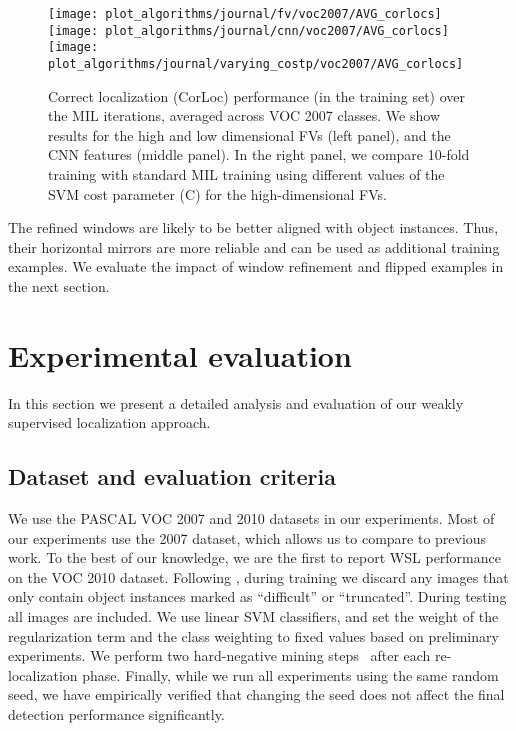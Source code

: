 \documentclass[10pt,journal,cspaper,final,twocolumn,compsoc]{./IEEEtran}
\def\VOC{PASCAL VOC }
\begin{document}
{\begin{table*}
\begin{center}
\begin{tabular}{|l|cccccccccccccccccccc|c|}
\hline
\end{tabular}
\end{center}
\end{table*}
}\begin{figure*}
\begin{center}
\texttt{[image: plot\_algorithms/journal/fv/voc2007/AVG\_corlocs]} 
\texttt{[image: plot\_algorithms/journal/cnn/voc2007/AVG\_corlocs]} 
\texttt{[image: plot\_algorithms/journal/varying\_costp/voc2007/AVG\_corlocs]} 
\end{center}
\caption{Correct localization (CorLoc) performance (in the training set) over the MIL
iterations, averaged across VOC 2007 classes. 
We show results for the high and low dimensional FVs (left panel), and the CNN features (middle panel). 
In the right panel, we compare 10-fold training  with standard MIL training using  different
values of the SVM cost parameter (C) for the high-dimensional FVs.}
\label{fig:avgcorlocs} 
\end{figure*}
The refined windows are likely to be better aligned with
object instances. Thus, their horizontal mirrors
are more reliable and can be used as additional training examples.
We evaluate the impact of window refinement and flipped
examples in the next section. 


\section{Experimental evaluation}\label{sec:experiments}

In this section we present a detailed analysis and
evaluation of our weakly supervised localization approach.

\subsection{Dataset and evaluation criteria}

We use the \VOC 2007 and 2010 datasets
\cite{everingham10ijcv} in our experiments.  Most of our
experiments use the 2007 dataset, which allows us to
compare to previous work. To the best of our knowledge, we
are the first to report WSL performance on the VOC 2010
dataset.  Following
\cite{deselaers12ijcv,pandey11iccv,shi13iccv}, during
training we discard any images that only contain object
instances marked as ``difficult'' or ``truncated''.
During testing all images are included.  We use linear SVM
classifiers, and set the weight of the regularization term
and the class weighting to fixed values based on
preliminary experiments. We perform two hard-negative
mining  steps~\cite{felzenszalb10pami} after each re-localization phase.
Finally, while we run all experiments using the same random seed,
we have empirically verified
that changing the seed does not affect the final
detection performance significantly.
\end{document}
